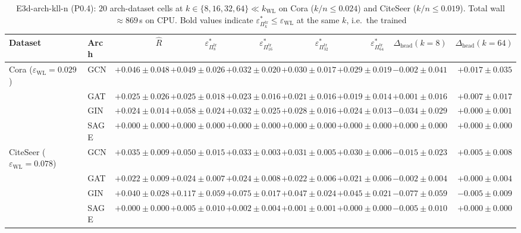 \documentclass[10pt]{article}
\theoremstyle{definition}
\theoremstyle{remark}
\newcommand{\eps}{\varepsilon}
\begin{document}
\begin{table}[h]\centering\small
\begin{tabular}{llrrrrrrr}
\toprule
Dataset & Arch & $\hat R$
 & $\eps^{*}_{\Pi^{\mathrm{tr}}_{8}}$
 & $\eps^{*}_{\Pi^{\mathrm{tr}}_{16}}$
 & $\eps^{*}_{\Pi^{\mathrm{tr}}_{32}}$
 & $\eps^{*}_{\Pi^{\mathrm{tr}}_{64}}$
 & $\Delta_{\mathrm{head}}(k{=}8)$
 & $\Delta_{\mathrm{head}}(k{=}64)$ \\
\midrule
Cora ($\eps_{\mathrm{WL}}{=}0.029$)
 & GCN  & $+0.046{\pm}0.048$ & $+0.049{\pm}0.026$ & $+0.032{\pm}0.020$ & $+0.030{\pm}0.017$ & $+0.029{\pm}0.019$ & $-0.002{\pm}0.041$ & $+0.017{\pm}0.035$ \\
 & GAT  & $+0.025{\pm}0.026$ & $+0.025{\pm}0.018$ & $+0.023{\pm}0.016$ & $+0.021{\pm}0.016$ & $\mathbf{+0.019{\pm}0.014}$ & $+0.001{\pm}0.016$ & $+0.007{\pm}0.017$ \\
 & GIN  & $+0.024{\pm}0.014$ & $+0.058{\pm}0.024$ & $+0.032{\pm}0.025$ & $+0.028{\pm}0.016$ & $\mathbf{+0.024{\pm}0.013}$ & $-0.034{\pm}0.029$ & $+0.000{\pm}0.001$ \\
 & SAGE & $\mathbf{+0.000{\pm}0.000}$ & $\mathbf{+0.000{\pm}0.000}$ & $\mathbf{+0.000{\pm}0.000}$ & $\mathbf{+0.000{\pm}0.000}$ & $\mathbf{+0.000{\pm}0.000}$ & $+0.000{\pm}0.000$ & $+0.000{\pm}0.000$ \\
\midrule
CiteSeer ($\eps_{\mathrm{WL}}{=}0.078$)
 & GCN  & $+0.035{\pm}0.009$ & $+0.050{\pm}0.015$ & $+0.033{\pm}0.003$ & $+0.031{\pm}0.005$ & $\mathbf{+0.030{\pm}0.006}$ & $-0.015{\pm}0.023$ & $+0.005{\pm}0.008$ \\
 & GAT  & $+0.022{\pm}0.009$ & $+0.024{\pm}0.007$ & $+0.024{\pm}0.008$ & $+0.022{\pm}0.006$ & $\mathbf{+0.021{\pm}0.006}$ & $-0.002{\pm}0.004$ & $+0.000{\pm}0.004$ \\
 & GIN  & $+0.040{\pm}0.028$ & $+0.117{\pm}0.059$ & $+0.075{\pm}0.017$ & $+0.047{\pm}0.024$ & $\mathbf{+0.045{\pm}0.021}$ & $-0.077{\pm}0.059$ & $-0.005{\pm}0.009$ \\
 & SAGE & $\mathbf{+0.000{\pm}0.000}$ & $+0.005{\pm}0.010$ & $+0.002{\pm}0.004$ & $+0.001{\pm}0.001$ & $\mathbf{+0.000{\pm}0.000}$ & $-0.005{\pm}0.010$ & $+0.000{\pm}0.000$ \\
\bottomrule
\end{tabular}
\caption{E3d-arch-kll-n (P0.4): $20$ arch-dataset cells at
$k \in \{8,16,32,64\} \ll k_{\mathrm{WL}}$ on Cora ($k/n \le
0.024$) and CiteSeer ($k/n \le 0.019$). Total wall $\approx
869\,$s on CPU. Bold values indicate $\eps^{*}_{\Pi^{\mathrm{tr}}_{k}}
\le \eps_{\mathrm{WL}}$ at the same $k$, i.e.\ the trained
}
\end{table}
\end{document}
